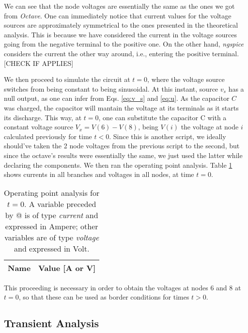 \par We can see that the node voltages are essentially the same as the ones we got from \textit{Octave}. One can immediately notice that current values for the voltage sources are approximately symmetrical to the ones presented in the theoretical analysis. This is because we have considered the current in the voltage sources going from the negative terminal to the positive one. On the other hand, \emph{ngspice} considers the current the other way around, i.e., entering the positive terminal. [CHECK IF APPLIES]

\par We then proceed to simulate the circuit at $t=0$, where the voltage source switches from being constant to being sinusoidal. At this instant, source $v_s$ has a null output, as one can infer from Eqs. \ref{eq:v_s} and \ref{eq:u}. As the capacitor $C$ was charged, the capacitor will mantain the voltage at its terminals as it starts its discharge. This way, at $t=0$, one can substitute the capacitor C with a constant voltage source $V_x = V(6)-V(8)$, being $V(i)$ the voltage at node $i$ calculated previously for time $t<0$. Since this is another script, we ideally should've taken the 2 node voltages from the previous script to the second, but since the octave's results were essentially the same, we just used the latter while declaring the components. We then ran the operating point analysis. Table \ref{tab:ngspice_2} shows currents in all branches and voltages in all nodes, at time $t=0$.

\begin{table}[H]
  \centering
  \begin{tabular}{|l|r|}
    \hline
    {\bf Name} & {\bf Value [A or V]} \\ \hline
  \end{tabular}
  \caption{Operating point analysis for $t=0$. A variable preceded by @ is of type {\em current}
    and expressed in Ampere; other variables are of type {\it voltage} and expressed in
    Volt.}
  \label{tab:ngspice_2}
\end{table}

\par This proceeding is necessary in order to obtain the voltages at nodes 6 and 8 at $t=0$, so that these can be used as border conditions for times $t>0$. 

\subsection{Transient Analysis}

